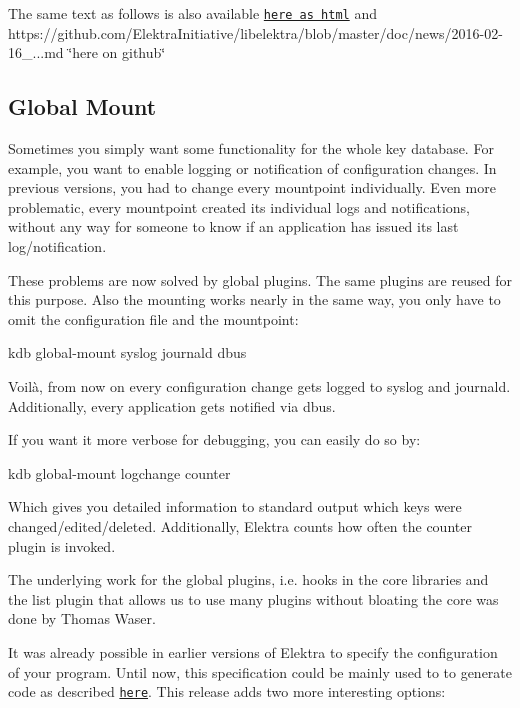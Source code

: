 The same text as follows is also available \href{https://doc.libelektra.org/news/1ab4a560-c286-46d2-a058-1a8e7e208fe8.html}{\tt here as html} and https\+://github.com/\+Elektra\+Initiative/libelektra/blob/master/doc/news/2016-\/02-\/16\+\_...\+md \char`\"{}here on github\char`\"{}

\subsection*{Global Mount}

Sometimes you simply want some functionality for the whole key database. For example, you want to enable logging or notification of configuration changes. In previous versions, you had to change every mountpoint individually. Even more problematic, every mountpoint created its individual logs and notifications, without any way for someone to know if an application has issued its last log/notification.

These problems are now solved by global plugins. The same plugins are reused for this purpose. Also the mounting works nearly in the same way, you only have to omit the configuration file and the mountpoint\+: \begin{DoxyVerb}kdb global-mount syslog journald dbus
\end{DoxyVerb}


Voilà, from now on every configuration change gets logged to syslog and journald. Additionally, every application gets notified via dbus.

If you want it more verbose for debugging, you can easily do so by\+: \begin{DoxyVerb}kdb global-mount logchange counter
\end{DoxyVerb}


Which gives you detailed information to standard output which keys were changed/edited/deleted. Additionally, Elektra counts how often the {\ttfamily counter} plugin is invoked.

The underlying work for the global plugins, i.\+e. hooks in the core libraries and the {\ttfamily list} plugin that allows us to use many plugins without bloating the core was done by Thomas Waser.

It was already possible in earlier versions of Elektra to specify the configuration of your program. Until now, this specification could be mainly used to to generate code as described \href{https://github.com/ElektraInitiative/libelektra/tree/master/src/tools/gen}{\tt here}. This release adds two more interesting options\+:


